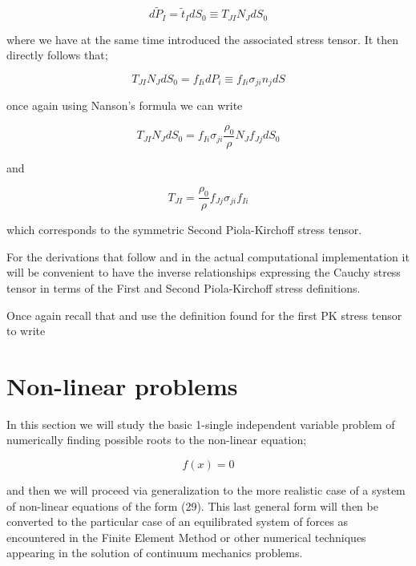 \begin{equation}
d{\tilde P_I} = {\tilde t_I}d{S_0} \equiv {T_{JI}}{N_J}d{S_0}
\label{unde tracts 1}
\end{equation}

where we have at the same time introduced the associated stress tensor.  It then directly follows that;

\begin{equation}
{T_{JI}}{N_J}d{S_0} = {f_{Ii}}d{P_i} \equiv {f_{Ii}}{\sigma _{ji}}{n_j}dS
\label{unde tracts 2}	 
\end{equation}

once again using Nanson's formula we can write

\begin{equation}
{T_{JI}}{N_J}d{S_0} = {f_{Ii}}{\sigma _{ji}}\frac{{{\rho _0}}}{\rho }{N_J}{f_{Jj}}d{S_0}
\label{unde tracts 3}
\end{equation}

and

\begin{equation}
{T_{JI}} = \frac{{{\rho _0}}}{\rho }{f_{Jj}}{\sigma _{ji}}{f_{Ii}}
\label{unde tracts 4}
\end{equation}

which corresponds to the symmetric Second Piola-Kirchoff stress tensor.

For the derivations that follow and in the actual computational implementation it will be convenient to have the inverse relationships expressing the Cauchy stress tensor in terms of the First and Second Piola-Kirchoff stress definitions.

Once again recall that   and use the definition found for the first PK stress tensor to write







\section{Non-linear problems}
In this section we will study the basic 1-single independent variable problem of numerically finding possible roots to the non-linear equation;

\begin{equation}
f(x) = 0
\label{1D}
\end{equation}

and then we will proceed via generalization to the more realistic case of a system of non-linear equations of the form (29).  This last general form will then be converted to the particular case of an equilibrated system of forces as encountered in the Finite Element Method or other numerical techniques appearing in the solution of continuum mechanics problems.


